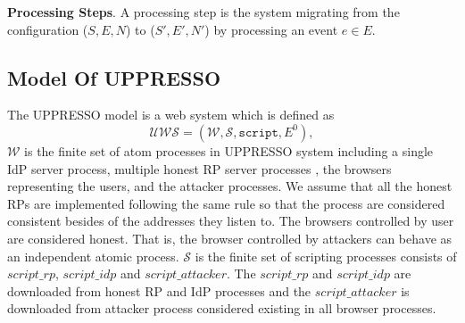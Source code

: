 \vspace{1mm}\noindent\textbf{Processing Steps}. A processing step is the system migrating from the configuration ($S, E, N$) to ($S', E', N'$) by processing an event $e \in E$. 

\subsection{Model Of UPPRESSO}
The UPPRESSO model is a web system which is defined as 
\begin{equation*}
    \mathcal{UWS} = (\mathcal{W}, \mathcal{S}, \mathtt{script}, E^0),
\end{equation*}
$\mathcal{W}$ is the finite set of atom processes in UPPRESSO system including a single IdP server process, multiple honest RP server processes , the browsers representing the users, and the attacker processes. We assume that all the honest RPs are implemented following the same rule so that the  process are considered consistent besides of the addresses they listen to. The browsers controlled by user are considered honest. That is, the browser controlled by attackers can behave as  an independent atomic process.
$\mathcal{S}$ is the finite set of scripting processes consists of $script\_rp$, $script\_idp$ and $script\_attacker$. The $script\_rp$ and $script\_idp$ are downloaded from honest RP and IdP processes and the $script\_attacker$ is downloaded from attacker process considered existing in all browser processes. 

